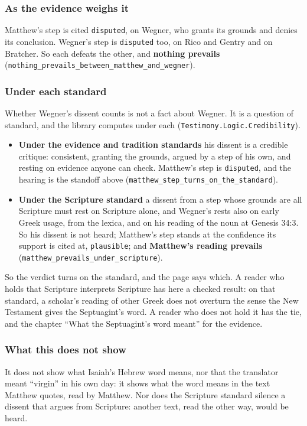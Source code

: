 \documentclass[11pt]{article}
\begin{document}
\subsubsection*{As the evidence weighs it}
Matthew’s step is cited \texttt{disputed}, on Wegner, who grants its grounds and denies its conclusion. Wegner’s step is \texttt{disputed} too, on Rico and Gentry and on Bratcher. So each defeats the other, and \textbf{nothing prevails} (\texttt{nothing\_\allowbreak{}prevails\_\allowbreak{}between\_\allowbreak{}matthew\_\allowbreak{}and\_\allowbreak{}wegner}).

\subsubsection*{Under each standard}
Whether Wegner’s dissent counts is not a fact about Wegner. It is a question of standard, and the library computes under each (\texttt{Testimony.Logic.Credibility}).

\begin{itemize}
  \item \textbf{Under the evidence and tradition standards} his dissent is a credible critique: consistent, granting the grounds, argued by a step of his own, and resting on evidence anyone can check. Matthew’s step is \texttt{disputed}, and the hearing is the standoff above (\texttt{matthew\_\allowbreak{}step\_\allowbreak{}turns\_\allowbreak{}on\_\allowbreak{}the\_\allowbreak{}standard}).
  \item \textbf{Under the Scripture standard} a dissent from a step whose grounds are all Scripture must rest on Scripture alone, and Wegner’s rests also on early Greek usage, from the lexica, and on his reading of the noun at Genesis 34:3. So his dissent is not heard; Matthew’s step stands at the confidence its support is cited at, \texttt{plausible}; and \textbf{Matthew’s reading prevails} (\texttt{matthew\_\allowbreak{}prevails\_\allowbreak{}under\_\allowbreak{}scripture}).
\end{itemize}
So the verdict turns on the standard, and the page says which. A reader who holds that Scripture interprets Scripture has here a checked result: on that standard, a scholar’s reading of other Greek does not overturn the sense the New Testament gives the Septuagint’s word. A reader who does not hold it has the tie, and the chapter “What the Septuagint’s word meant” for the evidence.

\subsubsection*{What this does not show}
It does not show what Isaiah’s Hebrew word means, nor that the translator meant “virgin” in his own day: it shows what the word means in the text Matthew quotes, read by Matthew. Nor does the Scripture standard silence a dissent that argues from Scripture: another text, read the other way, would be heard.
\end{document}
